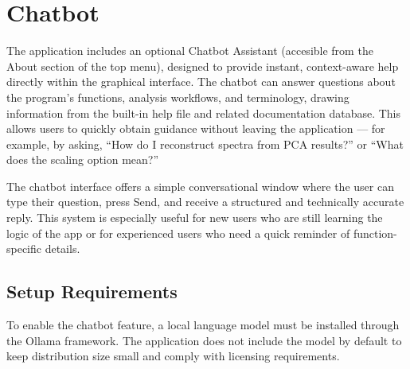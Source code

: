 \chapter{Chatbot}
\label{cha:Chatbot}

The application includes an optional Chatbot Assistant (accesible from the About section of the top menu), designed to provide instant, context-aware help directly within the graphical interface. The chatbot can answer questions about the program’s functions, analysis workflows, and terminology, drawing information from the built-in help file and related documentation database. This allows users to quickly obtain guidance without leaving the application — for example, by asking, “How do I reconstruct spectra from PCA results?” or “What does the scaling option mean?”

The chatbot interface offers a simple conversational window where the user can type their question, press Send, and receive a structured and technically accurate reply. This system is especially useful for new users who are still learning the logic of the app or for experienced users who need a quick reminder of function-specific details.

\section{Setup Requirements}

To enable the chatbot feature, a local language model must be installed through the Ollama framework. The application does not include the model by default to keep distribution size small and comply with licensing requirements.

